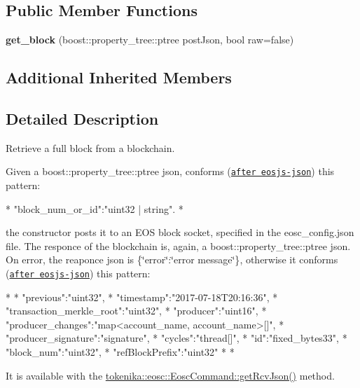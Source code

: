 \subsection*{Public Member Functions}
\begin{DoxyCompactItemize}
\item 
\mbox{\label{classtokenika_1_1eosc_1_1get__block_a0451628c8cd5ab10417e470be0302570}} 
{\bfseries get\+\_\+block} (boost\+::property\+\_\+tree\+::ptree post\+Json, bool raw=false)
\end{DoxyCompactItemize}
\subsection*{Additional Inherited Members}


\subsection{Detailed Description}
Retrieve a full block from a blockchain. 

Given a {\ttfamily boost\+::property\+\_\+tree\+::ptree json}, conforms (\href{#https://github.com/EOSIO/eosjs-json/blob/master/api/v1/chain.json}{\tt after eosjs-\/json}) this pattern\+: \begin{DoxyVerb}* {"block_num_or_id":"uint32 | string"}.
* \end{DoxyVerb}


the constructor posts it to an E\+OS block socket, specified in the {\ttfamily eosc\+\_\+config.\+json} file. The responce of the blockchain is, again, a {\ttfamily boost\+::property\+\_\+tree\+::ptree json}. On error, the reaponce json is {\ttfamily \{\char`\"{}error\char`\"{}\+:\char`\"{}error message\char`\"{}\}}, otherwise it conforms (\href{#https://github.com/EOSIO/eosjs-json/blob/master/api/v1/chain.json}{\tt after eosjs-\/json}) this pattern\+: \begin{DoxyVerb}* {
* "previous":"uint32",
* "timestamp":"2017-07-18T20:16:36",
* "transaction_merkle_root":"uint32",
* "producer":"uint16",
* "producer_changes":"map<account_name, account_name>[]",
* "producer_signature":"signature",
* "cycles":"thread[]",
* "id":"fixed_bytes33",
* "block_num":"uint32",
* "refBlockPrefix":"uint32"
* }
* \end{DoxyVerb}


It is available with the \hyperlink{classtokenika_1_1eosc_1_1_eosc_command_a2b451aefc95258d481cff16747fa1888}{tokenika\+::eosc\+::\+Eosc\+Command\+::get\+Rcv\+Json()} method.

